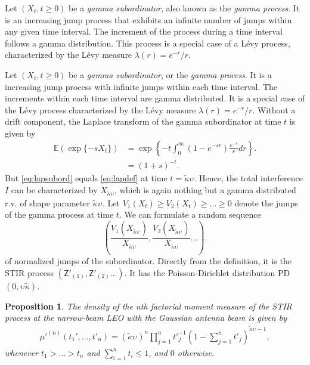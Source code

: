 \documentclass[lettersize,journal]{IEEEtran}
\newtheorem{prop}[theorem]{Proposition}
\begin{document}
Let $(X_{t}, t \geq 0)$ be a \textit{gamma subordinator}, also known as the \textit{gamma process}. It is an increasing jump process that exhibits an infinite number of jumps within any given time interval. The increment of the process during a time interval follows a gamma distribution. This process is a special case of a Lévy process, characterized by the Lévy measure $\lambda(r) = {e^{-r}}/{r}$.

Let $(X_{t}, t \geq 0)$ be a \textit{gamma subordinator}, or the \textit{gamma process}. It is a increasing jump process with infinite jumps within each time interval. The increments within each time interval are gamma distributed. It is a special case of the Lévy process characterized by the Lévy measure $\lambda(r) = e^{- r}/r$. Without a drift component, the Laplace transform of the gamma subordinator at time $t$ is given by
\begin{align}
  \label{eq:lapsubord}
  \mathbb{E}(\exp\{-s X_{t}\}) &= \exp\left\{-{t} \int_0^{\infty}(1-e^{-s r})\frac{e^{-r}}{r} dr \right\}. \nonumber \\
  &=(1+s)^{-t}.
\end{align}
But \eqref{eq:lapsubord} equals \eqref{eq:lapdef} at time $t=\tilde{\kappa}\upsilon_{} $. Hence, the total interference $I$ can be characterized by $X_{\tilde{\kappa} \upsilon_{}}$, which is again nothing but a gamma distributed r.v. of shape parameter $\tilde{\kappa}\upsilon_{}$. Let $V_1(X_{t}) \geq V_2(X_{t})\geq \dots \geq 0 $ denote the jumps of the gamma process at time $t$. We can formulate a random sequence
\begin{equation}
  \label{eq:relativesequence}
  \left(\frac{V_1(X_{\tilde{\kappa}\upsilon_{}})}{X_{\tilde{\kappa}\upsilon_{}}},\frac{V_2(X_{\tilde{\kappa}\upsilon_{}})}{X_{\tilde{\kappa}\upsilon_{}}} \dots \right).
\end{equation}
of normalized jumps of the subordinator. Directly from the definition, it is the STIR process $(\mathsf{Z}'_{(1)},\mathsf{Z}'_{(2)} \dots)$. It has the Poisson-Dirichlet distribution PD$(0, \upsilon_{} \tilde{\kappa})$. 




\begin{prop}
  The density of the n\textit{th} factorial moment measure of the STIR process at the narrow-beam LEO with the Gaussian antenna beam is given by
  \begin{align}
    \label{eq:factorialmoment}
    \mu'^{(n)}(t_1',\dots,t'_n) = (\tilde{\kappa}\upsilon_{})^n\prod_{j=1}^n{t'}_{j}^{-1}\left(1- \sum_{j=1}^nt'_j \right)^{\tilde{\kappa}\upsilon_{}-1},       
  \end{align}
  whenever $t_1>\dots >t_n$ and $\sum_{i=1}^n t_i \leq 1$, and $0$ otherwise.
\end{prop}
\end{document}
